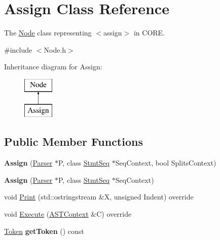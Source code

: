 \hypertarget{class_assign}{}\section{Assign Class Reference}
\label{class_assign}


The \mbox{\hyperlink{class_node}{Node}} class representing {\ttfamily $<$assign$>$} in C\+O\+RE.  




{\ttfamily \#include $<$Node.\+h$>$}

Inheritance diagram for Assign\+:\begin{figure}[H]
\begin{center}
\leavevmode
\includegraphics[height=2.000000cm]{class_assign}
\end{center}
\end{figure}
\subsection*{Public Member Functions}
\begin{DoxyCompactItemize}
\item 
\mbox{\label{class_assign_af3120048f9410bdbf92e1ad92e8d1b97}} 
{\bfseries Assign} (\mbox{\hyperlink{class_parser}{Parser}} $\ast$P, class \mbox{\hyperlink{class_stmt_seq}{Stmt\+Seq}} $\ast$Seq\+Context, bool Splits\+Context)
\item 
\mbox{\label{class_assign_acf5bf44389754741e5f42038a284e808}} 
{\bfseries Assign} (\mbox{\hyperlink{class_parser}{Parser}} $\ast$P, class \mbox{\hyperlink{class_stmt_seq}{Stmt\+Seq}} $\ast$Seq\+Context)
\item 
void \mbox{\hyperlink{class_assign_a1739f537e350e577898ae2447f928e4a}{Print}} (std\+::ostringstream \&X, unsigned Indent) override
\item 
void \mbox{\hyperlink{class_assign_a1803b147539aa47e431adc87c171a252}{Execute}} (\mbox{\hyperlink{class_a_s_t_context}{A\+S\+T\+Context}} \&C) override
\item 
\mbox{\label{class_assign_a5c11e02abf6c5e5562c63de70a516fd1}} 
\mbox{\hyperlink{class_token}{Token}} {\bfseries get\+Token} () const
\end{DoxyCompactItemize}
